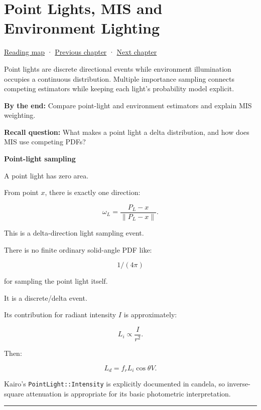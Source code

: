 \hypertarget{03-visual-computing-i-ch009}{}
\chapter{Point Lights, MIS and Environment Lighting}\label{stagechapter:03-visual-computing-i-ch009}\label{03-visual-computing-i-ch009-point-lights-mis-and-environment-lighting}

\hyperref[volume-reading-map]{Reading map} · \hyperref[03-visual-computing-i-ch008-sampling-directions-and-light-transport]{Previous chapter} · \hyperref[03-visual-computing-i-ch010-a-production-path-tracer-media-randomness-and-validation]{Next chapter}

Point lights are discrete directional events while environment illumination occupies a continuous distribution. Multiple importance sampling connects competing estimators while keeping each light's probability model explicit.

\textbf{By the end:} Compare point-light and environment estimators and explain MIS weighting.

\textbf{Recall question:} What makes a point light a delta distribution, and how does MIS use competing PDFs?

\textbf{Point-light sampling}

A point light has zero area.

From point \(x\), there is exactly one direction:

\[
\omega_L
=
\frac{
P_L-x
}{
\|P_L-x\|
}.
\]

This is a delta-direction light sampling event.

There is no finite ordinary solid-angle PDF like:

\[
1/(4\pi)
\]

for sampling the point light itself.

It is a discrete/delta event.

Its contribution for radiant intensity \(I\) is approximately:

\[
L_i
\propto
\frac{
I
}{
r^2
}.
\]

Then:

\[
L_d
=
f_r
L_i
\cos\theta
V.
\]

Kairo's \texttt{PointLight::Intensity} is explicitly documented in candela, so inverse-square attenuation is appropriate for its basic photometric interpretation.

\begin{center}\rule{0.5\linewidth}{0.5pt}\end{center}

